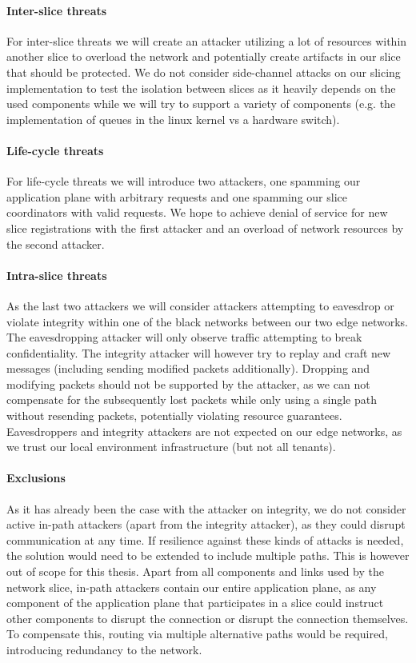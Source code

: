 \paragraph{Inter-slice threats} For inter-slice threats we will create an attacker utilizing a lot of resources within another slice to overload the network and potentially create artifacts in our slice that should be protected. We do not consider side-channel attacks on our slicing implementation to test the isolation between slices as it heavily depends on the used components while we will try to support a variety of components (e.g. the implementation of queues in the linux kernel vs a hardware switch).

\paragraph{Life-cycle threats} For life-cycle threats we will introduce two attackers, one spamming our application plane with arbitrary requests and one spamming our slice coordinators with valid requests. We hope to achieve denial of service for new slice registrations with the first attacker and an overload of network resources by the second attacker.

\paragraph{Intra-slice threats} As the last two attackers we will consider attackers attempting to eavesdrop or violate integrity within one of the black networks between our two edge networks. The eavesdropping attacker will only observe traffic attempting to break confidentiality. The integrity attacker will however try to replay and craft new messages (including sending modified packets additionally). Dropping and modifying packets should not be supported by the attacker, as we can not compensate for the subsequently lost packets while only using a single path without resending packets, potentially violating resource guarantees. Eavesdroppers and integrity attackers are not expected on our edge networks, as we trust our local environment infrastructure (but not all tenants).

\paragraph{Exclusions} As it has already been the case with the attacker on integrity, we do not consider active in-path attackers (apart from the integrity attacker), as they could disrupt communication at any time. If resilience against these kinds of attacks is needed, the solution would need to be extended to include multiple paths. This is however out of scope for this thesis. Apart from all components and links used by the network slice, in-path attackers contain our entire application plane, as any component of the application plane that participates in a slice could instruct other components to disrupt the connection or disrupt the connection themselves. To compensate this, routing via multiple alternative paths would be required, introducing redundancy to the network.

